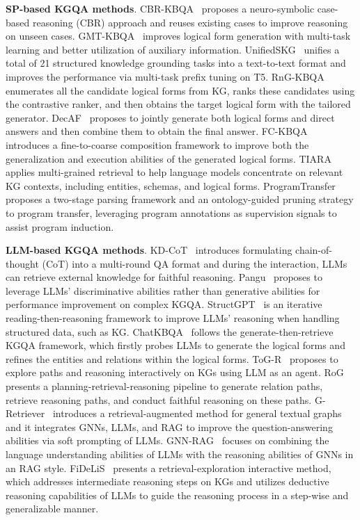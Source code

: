 \textbf{SP-based KGQA methods}.
CBR-KBQA~\cite{CBR-KBQA} proposes a neuro-symbolic case-based reasoning (CBR) approach and reuses existing cases to improve reasoning on unseen cases.
GMT-KBQA~\cite{GMT-KBQA} improves logical form generation with multi-task learning and better utilization of auxiliary information.
UnifiedSKG~\cite{xie-etal-2022-unifiedskg} unifies a total of 21 structured knowledge grounding tasks into a text-to-text format and improves the performance via multi-task prefix tuning on T5.
RnG-KBQA~\cite{rng-kbqa} enumerates all the candidate logical forms from KG, ranks these candidates using the contrastive ranker, and then obtains the target logical form with the tailored generator.
DecAF~\cite{decaf} proposes to jointly generate both logical forms and direct answers and then combine them to obtain the final answer.
FC-KBQA~\cite{fc-kbqa} introduces a fine-to-coarse composition framework to improve both the generalization and execution abilities of the generated logical forms.
TIARA~\cite{shu-etal-2022-tiara} applies multi-grained retrieval to help language models concentrate on relevant KG contexts, including entities, schemas, and logical forms.
ProgramTransfer~\cite{ProgramTransfer} proposes a two-stage parsing framework and an ontology-guided pruning strategy to program transfer, leveraging program annotations as supervision signals to assist program induction.

\textbf{LLM-based KGQA methods}.
KD-CoT~\cite{wang2023knowledge} introduces formulating chain-of-thought (CoT) into a multi-round QA format and during the interaction, LLMs can retrieve external knowledge for faithful reasoning.
Pangu~\cite{pangu} proposes to leverage LLMs' discriminative abilities rather than generative abilities for performance improvement on complex KGQA.
StructGPT~\cite{structgpt} is an iterative reading-then-reasoning framework to improve LLMs' reasoning when handling structured data, such as KG.
ChatKBQA~\cite{chatkbqa} follows the generate-then-retrieve KGQA framework, which firstly probes LLMs to generate the logical forms and refines the entities and relations within the logical forms.
ToG-R~\cite{TOG} proposes to explore paths and reasoning interactively on KGs using LLM as an agent.
RoG~\cite{RoG} presents a planning-retrieval-reasoning pipeline to generate relation paths, retrieve reasoning paths, and conduct faithful reasoning on these paths.
G-Retriever~\cite{G-retriever} introduces a retrieval-augmented method for general textual graphs and it integrates GNNs, LLMs, and RAG to improve the question-answering abilities via soft prompting of LLMs.
GNN-RAG~\cite{mavromatis2024gnn} focuses on combining the language understanding abilities of LLMs with the reasoning abilities of GNNs in an RAG style.
FiDeLiS~\cite{sui2024fidelis} presents a retrieval-exploration interactive method, which addresses intermediate reasoning steps on KGs and utilizes deductive reasoning capabilities of LLMs to guide the reasoning process in a step-wise and generalizable manner.

